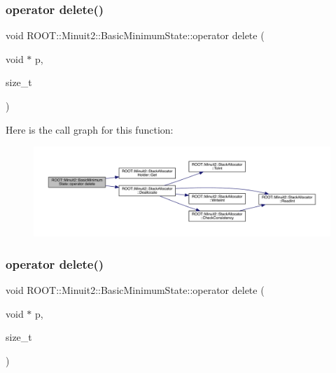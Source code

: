 \mbox{\label{classROOT_1_1Minuit2_1_1BasicMinimumState_a19ccca7f7825c16fca3c7ab6f147fdd6}} 
\subsubsection{\texorpdfstring{operator delete()}{operator delete()}\hspace{0.1cm}{\footnotesize\ttfamily [1/2]}}
{\footnotesize\ttfamily void R\+O\+O\+T\+::\+Minuit2\+::\+Basic\+Minimum\+State\+::operator delete (\begin{DoxyParamCaption}\item[{void $\ast$}]{p,  }\item[{size\+\_\+t}]{ }\end{DoxyParamCaption})\hspace{0.3cm}{\ttfamily [inline]}}

Here is the call graph for this function\+:
\nopagebreak
\begin{figure}[H]
\begin{center}
\leavevmode
\includegraphics[width=350pt]{d0/db1/classROOT_1_1Minuit2_1_1BasicMinimumState_a19ccca7f7825c16fca3c7ab6f147fdd6_cgraph}
\end{center}
\end{figure}
\mbox{\label{classROOT_1_1Minuit2_1_1BasicMinimumState_a19ccca7f7825c16fca3c7ab6f147fdd6}} 
\subsubsection{\texorpdfstring{operator delete()}{operator delete()}\hspace{0.1cm}{\footnotesize\ttfamily [2/2]}}
{\footnotesize\ttfamily void R\+O\+O\+T\+::\+Minuit2\+::\+Basic\+Minimum\+State\+::operator delete (\begin{DoxyParamCaption}\item[{void $\ast$}]{p,  }\item[{size\+\_\+t}]{ }\end{DoxyParamCaption})\hspace{0.3cm}{\ttfamily [inline]}}

